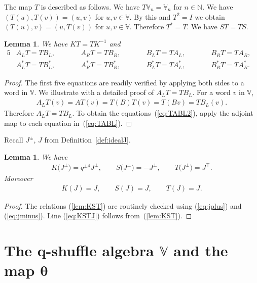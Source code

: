 \documentclass[11pt]{article}
\numberwithin{equation}{section}
\numberwithin{equation}{section}
\newtheorem{Lemma}[Theorem]{Lemma}
\begin{document}
{The map $T$ is described as follows. We have $T\mathbb V_n=\mathbb V_n$ for $n \in \mathbb N$. We have
$(T(u), T(v))=(u,v)$ for $u,v \in \mathbb V$.
By this and $T^2=I$ we obtain
$(T(u), v)=(u,T(v))$ for $u,v \in \mathbb V$.
Therefore
$T^*=T$. We have
$ST=TS$.
\begin{Lemma}
\label{lem:Tact}
We have $KT=TK^{-1}$ and
\begin{alignat}{5}
& A_L T = T B_L, \qquad &&
A_R T = T B_R, \qquad &&
B_L T = T A_L, \qquad &&
B_R T = T A_R, & \label{eq:TABL}\\
& A^*_L T = T B^*_L, \qquad &&
A^*_R T = T B^*_R, \qquad &&
B^*_L T = T A^*_L, \qquad &&
B^*_R T = T A^*_R. &\label{eq:TABL2}
\end{alignat}
\end{Lemma}
\begin{proof} The first five equations are readily verified by applying both sides to a word in $\mathbb V$.
We illustrate with a detailed proof of $A_L T = T B_L$.
For a word $v$ in $\mathbb V$,
\begin{gather*}
A_L T(v) = A T(v) = T(B)T(v) = T(Bv) = T B_L(v).
\end{gather*}
Therefore $A_L T = T B_L$. To obtain the equations~(\ref{eq:TABL2}), apply the adjoint map to each equation in~(\ref{eq:TABL}).
\end{proof}

Recall $J^{\pm}$, $J$ from Definition~\ref{def:idealJ}.

\begin{Lemma}\label{lem:Jinv}We have
\begin{gather}\label{lem:KST}
K\big(J^{\pm }\big) = q^{\pm 4} J^{\pm },
\qquad
S\big(J^{\pm }\big) = -J^{\pm },
\qquad
T\big(J^{\pm }\big) = J^{\mp }.
\end{gather}
Moreover
\begin{gather}\label{eq:KSTJ}
K (J) = J, \qquad S (J) = J, \qquad T (J) = J.
\end{gather}
\end{Lemma}
\begin{proof}  The relations
(\ref{lem:KST}) are routinely checked using
(\ref{eq:jplus}) and
(\ref{eq:jminus}).
Line (\ref{eq:KSTJ}) follows from~(\ref{lem:KST}).
\end{proof}

\section[The $q$-shuffle algebra $\mathbb V$ and the map $\theta$]{The $\boldsymbol{q}$-shuffle algebra $\boldsymbol{\mathbb V}$ and the map $\boldsymbol{\theta}$}\label{section6}

}
\end{document}
